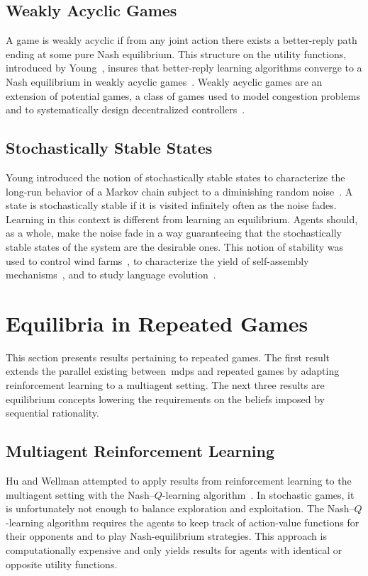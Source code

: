 \subsection{Weakly Acyclic Games}
A game is weakly acyclic if from any joint action there exists a better-reply path ending at some pure Nash equilibrium.
This structure on the utility functions, introduced by Young~\cite{young:1998}, insures that better-reply learning
algorithms converge to a Nash equilibrium in weakly acyclic games~\cite{young:2004}.
Weakly acyclic games are an extension of potential games, a class of games used to model congestion problems and to systematically design decentralized controllers~\cite{li_marden:2011}.

\subsection{Stochastically Stable States}
Young introduced the notion of stochastically stable states to characterize the long-run behavior of a Markov chain subject to a diminishing random noise~\cite{young:1993}.
A state is stochastically stable if it is visited infinitely often as the noise fades.
Learning in this context is different from learning an equilibrium.
Agents should, as a whole, make the noise fade in a way guaranteeing that the stochastically stable states of the system are the desirable ones.
This notion of stability was used to control wind farms~\cite{marden_young_pao:2012}, to characterize the yield of self-assembly mechanisms~\cite{fox_shamma:2011:self-assembly}, and to study language evolution~\cite{fox_shamma:2011:language}.

\section{Equilibria in Repeated Games}

This section presents results pertaining to repeated games.
The first result extends the parallel existing between~\acp{mdp} and repeated games by adapting reinforcement learning to a multiagent setting.
The next three results are equilibrium concepts lowering the requirements on the beliefs imposed by sequential rationality.

\subsection{Multiagent Reinforcement Learning}
Hu and Wellman attempted to apply results from reinforcement learning to the multiagent setting with the Nash--\(Q\)-learning algorithm~\cite{hu_wellman:2003}.
In stochastic games, it is unfortunately not enough to balance exploration and exploitation.
The Nash--\(Q\)-learning algorithm requires the agents to keep track of action-value functions for their opponents and to play Nash-equilibrium strategies.
This approach is computationally expensive and only yields results for agents with identical or opposite utility functions.

